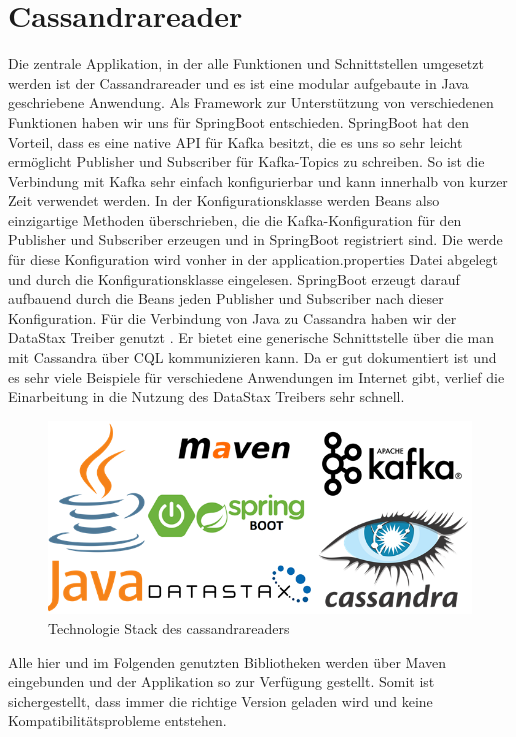 \section{Cassandrareader}
Die zentrale Applikation, in der alle Funktionen und Schnittstellen umgesetzt werden ist der Cassandrareader und es ist eine modular aufgebaute in Java geschriebene Anwendung. Als Framework zur Unterstützung von verschiedenen Funktionen haben wir uns für SpringBoot entschieden. SpringBoot hat den Vorteil, dass es eine native API für Kafka besitzt, die es uns so sehr leicht ermöglicht Publisher und Subscriber für Kafka-Topics zu schreiben. So ist die Verbindung mit Kafka sehr einfach konfigurierbar und kann innerhalb von kurzer Zeit verwendet werden. In der Konfigurationsklasse werden Beans also einzigartige Methoden überschrieben, die die Kafka-Konfiguration für den Publisher und Subscriber erzeugen und in SpringBoot registriert sind. Die werde für diese Konfiguration wird vonher in der application.properties Datei abgelegt und durch die Konfigurationsklasse eingelesen. SpringBoot erzeugt darauf aufbauend durch die Beans jeden Publisher und Subscriber nach dieser Konfiguration.
Für die Verbindung von Java zu Cassandra haben wir der DataStax Treiber genutzt \cite{DataStax}. Er bietet eine generische Schnittstelle über die man mit Cassandra über CQL kommunizieren kann. Da er gut dokumentiert ist und es sehr viele Beispiele für verschiedene Anwendungen im Internet gibt, verlief die Einarbeitung in die Nutzung des DataStax Treibers sehr schnell.
\begin{figure}[htbp]
	\centering
	\includegraphics[scale=0.5]{pics/tech_stack.png}
	\caption{Technologie Stack des cassandrareaders}
	\label{fig:techStackCass}
\end{figure}
Alle hier und im Folgenden genutzten Bibliotheken werden über Maven eingebunden und der Applikation so zur Verfügung gestellt. Somit ist sichergestellt, dass immer die richtige Version geladen wird und keine Kompatibilitätsprobleme entstehen.

